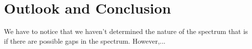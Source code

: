 \chapter{Outlook and Conclusion}	
	
We have to notice that we haven't determined the nature of the spectrum that is if there are possible gaps in the spectrum. However,... %